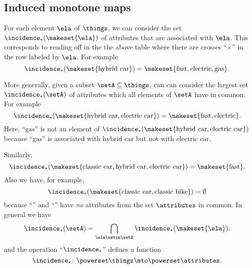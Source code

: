 {\subsection{Induced monotone maps}

For each element $\ela$ of $\things$, we can consider the set $\incidence_*(\makeset{\ela})$ of attributes that are associated with $\ela$. This corresponds to reading off in the the above table where there are crosses ``$\times$'' in the row labeled by $\ela$. For example
\begin{equation}
\incidence_*(\makeset{\text{hybrid car}}) = \makeset{\text{fast}, \text{electric}, \text{gas}}. 
\end{equation}


More generally, given a subset $\setA \subseteq \things$, can can consider the largest set $\incidence_*(\setA)$ of attributes which all elements of $\setA$ have in common. For example 
\begin{equation}
\incidence_*(\makeset{\text{hybrid car}, \text{electric car}}) = \makeset{\text{fast}, \text{electric}}. 
\end{equation}
Here, ``$\text{gas}$'' is not an element of $\incidence_*(\makeset{\text{hybrid car}, \text{electric car}})$ because ``$\text{gas}$'' is associated with $\text{hybrid car}$ but not with $\text{electric car}$.  

Similarly, 
\begin{equation}
\incidence_*(\makeset{\text{classic car}, \text{hybrid car}, \text{electric car}}) = \makeset{\text{fast}}. 
\end{equation}
Also we have, for example, 
\begin{equation}
\incidence_*(\makeset{\text{classic car}, \text{classic bike}}) = \emptyset
\end{equation}
because ``'' and ``'' have \emph{no} attributes from the set $\attributes$ in common. In general we have 
\begin{equation}
\incidence_*(\setA) = \bigcap_{\ela \setin \setA} \incidence_*(\makeset{\ela}).
\end{equation}
and the operation ``$\incidence_*$'' defines a function 
\begin{equation}
\incidence_* \colon \powerset \things \mto \powerset \attributes.
\end{equation}

}
